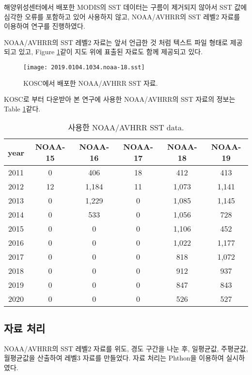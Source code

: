 해양위성센터에서 배포한 MODIS의 SST 데이터는 구름이 제거되지 않아서 SST 값에 심각한 오류를 포함하고 있어 사용하지 않고, NOAA/AVHRR의 SST 레벨2 자료를 이용하여 연구를 진행하였다. 

NOAA/AVHRR의 SST 레벨2 자료는 앞서 언급한 것 처럼 텍스트 파일 형태로 제공되고 있고, Figure \ref{fig:SST-KOSC}\와 같이 지도 위에 표출된 자료도 함께 제공되고 있다. 

\begin{figure}[htbp]
	\centerline{\texttt{[image: 2019.0104.1034.noaa-18.sst]}}
	\caption{KOSC에서 배포한 NOAA/AVHRR SST 자료.}
	\label{fig:SST-KOSC}
\end{figure}

KOSC로 부터 다운받아 본 연구에 사용한 NOAA/AVHRR의 SST 자료의 정보는 Table \ref{table:NOAA-data}\와 같다.

\begin{table}[!htbp]
	\caption{사용한 NOAA/AVHRR SST data.}

	\begin{tabular}{c|c|c|c|c|c}
		\hline
		
		\hline
		year   & NOAA-15 & NOAA-16 & NOAA-17 & NOAA-18 & NOAA-19 \\ 
		
		\hline
		
		\hline
		2011 & 0       & 406     & 18      & 412     & 413     \\ \hline
		2012 & 12      & 1,184   & 11      & 1,073   & 1,141   \\ \hline
		2013 & 0       & 1,229   & 0       & 1,085   & 1,145   \\ \hline
		2014 & 0       & 533     & 0       & 1,056   & 728     \\ \hline
		2015 & 0       & 0       & 0       & 1,106   & 452     \\ \hline
		2016 & 0       & 0       & 0       & 1,022   & 1,177   \\ \hline
		2017 & 0       & 0       & 0       & 818     & 1,072   \\ \hline
		2018 & 0       & 0       & 0       & 912     & 937     \\ \hline
		2019 & 0       & 0       & 0       & 847     & 843     \\ \hline
		2020 & 0       & 0       & 0       & 526     & 527     \\ 
		
		\hline

		\hline
	\end{tabular}
	\label{table:NOAA-data}
\end{table}


\newpage
\subsection{자료 처리}

NOAA/AVHRR의 SST 레벨2 자료를 위도, 경도 구간을 나눈 후, 일평균값, 주평균값, 월평균값을 산출하여 레벨3 자료를 만들었다. 자료 처리는 Phthon을 이용하여 실시하였다. 

